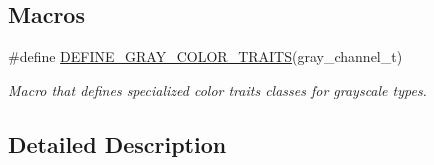 \subsection*{Macros}
\begin{DoxyCompactItemize}
\item 
\hypertarget{group___color_traits_ga02ba6c4706c9e998a2fa50912709bac2}{\#define \hyperlink{group___color_traits_ga02ba6c4706c9e998a2fa50912709bac2}{D\-E\-F\-I\-N\-E\-\_\-\-G\-R\-A\-Y\-\_\-\-C\-O\-L\-O\-R\-\_\-\-T\-R\-A\-I\-T\-S}(gray\-\_\-channel\-\_\-t)}\label{group___color_traits_ga02ba6c4706c9e998a2fa50912709bac2}

\begin{DoxyCompactList}\small\item\em Macro that defines specialized color traits classes for grayscale types. \end{DoxyCompactList}\end{DoxyCompactItemize}


\subsection{Detailed Description}
